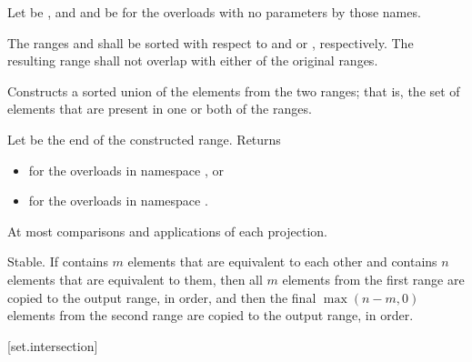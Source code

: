 \begin{itemdescr}
\pnum
Let  be ,
and  and  be 
for the overloads with no parameters by those names.

\pnum
\requires
The ranges  and  shall be sorted
with respect to  and  or , respectively.
The resulting range shall not overlap with either of the original ranges.

\pnum
\effects
Constructs a sorted union of the elements from the two ranges;
that is, the set of elements that are present in one or both of the ranges.

\pnum
\returns
Let  be the end of the constructed range.
Returns
\begin{itemize}
\item
  for the overloads in namespace , or
\item
  for the overloads in namespace .
\end{itemize}

\pnum
\complexity
At most 
comparisons and applications of each projection.

\pnum
\remarks
Stable.
If  contains $m$ elements
that are equivalent to each other and
 contains $n$ elements
that are equivalent to them,
then all $m$ elements from the first range
are copied to the output range, in order, and
then the final $\max(n - m, 0)$ elements from the second range
are copied to the output range, in order.
\end{itemdescr}

[set.intersection]{}

